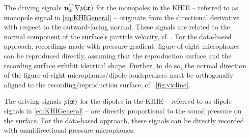 The driving signals $\bm{n}^\mathrm{T}_{\bm{x}} \, \nabla p(\bm{x})$ for the monopoles in the
KHIE -- referred to as monopole signal in \myeq\eqref{eq:KHIGeneral} -- originate
from the directional derivative with respect to the outward-facing normal.
%
These signals are related to the normal component of the surface's particle
velocity, cf. \cite{Berkhout1993_JASA, Vries1996_JAES}.
%
For the data-based approach, recordings made with pressure-gradient,
figure-of-eight microphones can be reproduced directly, assuming that
the reproduction surface and the recording surface exhibit identical shape.
Further, to do so, the normal direction of the
figure-of-eight microphones/dipole loudspeakers must be orthogonally aligned
to the recording/reproduction surface, cf.~\myfig\ref{fig:violine}.



The driving signals $p(\bm{x})$ for the dipoles in the KHIE -- referred to as dipole
signals in \myeq\eqref{eq:KHIGeneral} -- are directly proportional to the
sound pressure on the surface.
%
For the data-based approach, these signals can be directly recorded with
omnidirectional pressure microphones.



